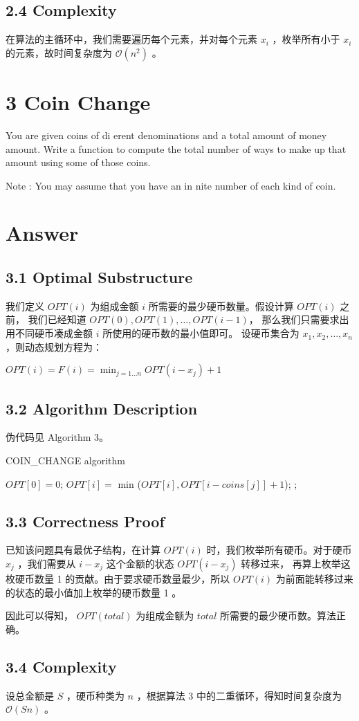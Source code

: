 \documentclass[UTF8]{ctexart}
\begin{document}
\subsection*{2.4 Complexity}
在算法的主循环中，我们需要遍历每个元素，并对每个元素 $x_i$ ，枚举所有小于 $x_i$ 的元素，故时间复杂度为 $\mathcal{O}(n^2)$ 。
\section*{3 Coin Change}
You are given coins of di erent denominations and a total amount of money amount. Write a
function to compute the total number of ways to make up that amount using some of those coins.

Note : You may assume that you have an in nite number of each kind of coin.
\section*{Answer}
\subsection*{3.1 Optimal Substructure }
我们定义 $OPT(i)$ 为组成金额 $i$ 所需要的最少硬币数量。假设计算 $OPT(i)$ 之前， 我们已经知道 $OPT(0), OPT(1), \dots, OPT(i-1)$， 那么我们只需要求出用不同硬币凑成金额 $i$ 所使用的硬币数的最小值即可。
设硬币集合为 ${x_1, x_2,\dots,x_n}$ ，则动态规划方程为：

$OPT(i) = F(i)=\min _{j=1 . . . n} OPT\left(i-x_{j}\right) + 1$
\subsection*{3.2 Algorithm Description}
伪代码见 Algorithm 3。
\begin{algorithm}[h]
	\caption{COIN\_CHANGE algorithm}
	\begin{algorithmic}[1]
        \State $OPT[0] = 0$; 
                \State $OPT[i] =$ min ($OPT[i], OPT[i-coins[j]] + 1$);
            \EndFor
        \EndFor
        \State {};
        \EndFunction
	\end{algorithmic}
\end{algorithm}
\subsection*{3.3 Correctness Proof}
已知该问题具有最优子结构，在计算 $OPT(i)$ 时，我们枚举所有硬币。对于硬币 $x_j$ ，我们需要从 $i - x_j$ 这个金额的状态 $OPT(i - x_j)$ 转移过来，
再算上枚举这枚硬币数量 1 的贡献。由于要求硬币数量最少，所以 $OPT(i)$ 为前面能转移过来的状态的最小值加上枚举的硬币数量 1 。

因此可以得知， $OPT(total)$ 为组成金额为 $total$ 所需要的最少硬币数。算法正确。
\subsection*{3.4 Complexity}
设总金额是 $S$ ，硬币种类为 $n$ ，根据算法 3 中的二重循环，得知时间复杂度为 $\mathcal{O}(Sn)$ 。
\end{document}
